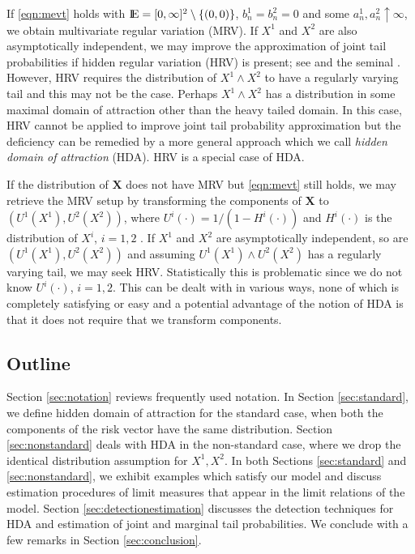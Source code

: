 \documentclass[11 pt]{amsart}
\numberwithin{equation}{section}
\begin{document}
If  \eqref{eqn:mevt} holds with ${\mathop{\rm I\kern -0.20em E}\nolimits} = [0, \infty]^2 \setminus \{
(0, 0)\}$, $b^1_n = b^2_n = 0$ and some $a^1_n, a^2_n \uparrow
\infty$, we obtain multivariate regular variation
(MRV). {I}f $X^1$ and $X^2$ are {also} asymptotically
independent, we {may improve the approximation of}
 joint tail probabilities {if} 
hidden regular variation (HRV)  is present; see \citet{resnick:2002a, 
mitra:resnick:2010a,
resnickbook:2007}
and the seminal 
\citet{ledford:tawn:1996, ledford:tawn:1998}. However, HRV requires
the distribution of {$X^1 \wedge X^2$} to have a regularly varying
tail and this may not be the case.  Perhaps
$X^1 \wedge X^2$ has a distribution in some maximal domain of
attraction 
other than the heavy tailed domain. In this case,
HRV cannot be applied to improve
  joint tail probability approximation 
but the deficiency can be remedied by a more general approach
which we call {\it hidden
domain of attraction\/} (HDA). HRV is a special case of HDA. 

If the distribution of ${\boldsymbol X}$ 
does not have MRV but \eqref{eqn:mevt} still holds,
we may retrieve the MRV setup by transforming the
 components of ${\boldsymbol X}$ to $\left(U^1(X^1), U^2(X^2)\right)$, where
 $U^i(\cdot) = 1/(1-H^i(\cdot))$ and $H^i(\cdot)$ is the distribution
 of $X^i$, $i =1, 2$ \cite[page 265]{resnickbook:2008}. If  $X^1$ and
 $X^2$ are asymptotically independent, {so are $\left(U^1(X^1),
   U^2(X^2)\right)$ and assuming $U^1(X^1) \wedge U^2(X^2)$ has a
 regularly varying tail, we may seek HRV.} Statistically this is
problematic since we do not know
 $U^i(\cdot)$, $i =1, 2$. This can be dealt with in various ways, none
 of which is completely satisfying or easy and a potential
{advantage of the notion of HDA is
 that it does not require that we transform components.}

 
 \subsection{Outline} Section \ref{sec:notation} reviews frequently
 used notation. In Section \ref{sec:standard}, we define {hidden domain of attraction } for the
 standard case, when both the components of the risk vector have the
 same distribution. Section \ref{sec:nonstandard} deals with HDA in
 the non-standard case, where we 
{drop the identical distribution assumption for $X^1,X^2$.}
In both 
Sections \ref{sec:standard} and \ref{sec:nonstandard},
we  exhibit examples which satisfy our model and discuss estimation 
 procedures of limit measures that appear in the limit relations of
 the model. Section \ref{sec:detectionestimation} discusses the
 detection techniques for HDA and estimation of joint and marginal
 tail probabilities. We conclude with a few remarks in Section
 \ref{sec:conclusion}. 
 
\end{document}
